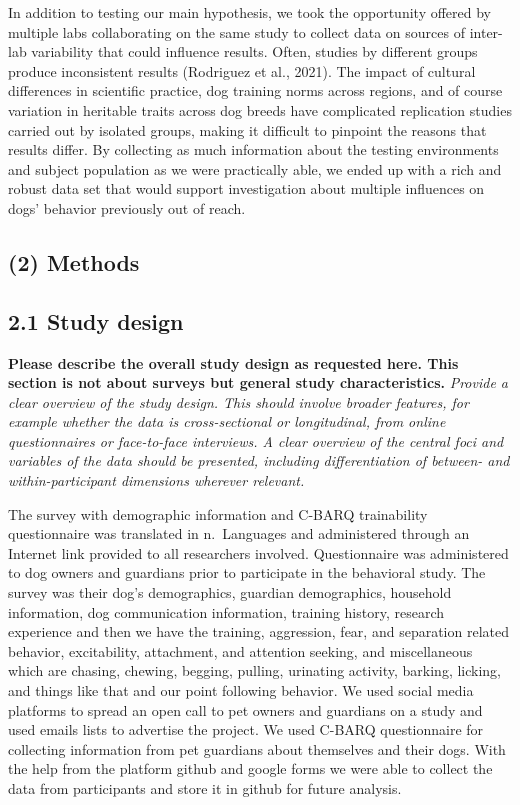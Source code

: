 \documentclass[
  man,floatsintext]{apa6}
\begin{document}
In addition to testing our main hypothesis, we took the opportunity offered by multiple labs collaborating on the same study to collect data on sources of inter-lab variability that could influence results. Often, studies by different groups produce inconsistent results (Rodriguez et al., 2021). The impact of cultural differences in scientific practice, dog training norms across regions, and of course variation in heritable traits across dog breeds have complicated replication studies carried out by isolated groups, making it difficult to pinpoint the reasons that results differ. By collecting as much information about the testing environments and subject population as we were practically able, we ended up with a rich and robust data set that would support investigation about multiple influences on dogs' behavior previously out of reach.~

\hypertarget{methods}{%
\subsection{(2) Methods}\label{methods}}

\hypertarget{study-design}{%
\subsection{2.1 Study design}\label{study-design}}

\textbf{Please describe the overall study design as requested here. This section is not about surveys but general study characteristics.}
\emph{Provide a clear overview of the study design. This should involve broader features, for example whether the data is cross-sectional or longitudinal, from online questionnaires or face-to-face interviews. A clear overview of the central foci and variables of the data should be presented, including differentiation of between- and within-participant dimensions wherever relevant.}

The survey with demographic information and C-BARQ trainability questionnaire was translated in n.~Languages and administered through an Internet link provided to all researchers involved. Questionnaire was administered to dog owners and guardians prior to participate in the behavioral study. The survey was their dog's demographics, guardian demographics, household information, dog communication information, training history, research experience and then we have the training, aggression, fear, and separation related behavior, excitability, attachment, and attention seeking, and miscellaneous which are chasing, chewing, begging, pulling, urinating activity, barking, licking, and things like that and our point following behavior. We used social media platforms to spread an open call to pet owners and guardians on a study and used emails lists to advertise the project. We used C-BARQ questionnaire for collecting information from pet guardians about themselves and their dogs. With the help from the platform github and google forms we were able to collect the data from participants and store it in github for future analysis.
\end{document}
